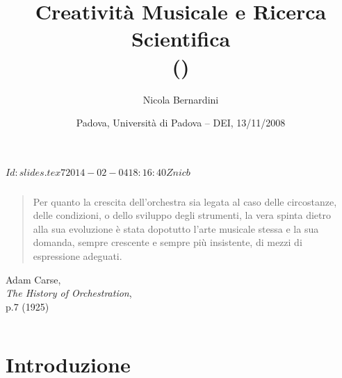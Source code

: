 \documentclass[compress]{beamer}
\title[Creativit\`a Musicale e Ricerca Scientifica]
{%
    Creativit\`a Musicale e Ricerca Scientifica\\
	{\tiny (\rcstag)}
}
\author{%
	Nicola Bernardini\\
    \href{mailto:\cpholderemail}{\cpholderemail}
}
\institute[SME-CCPPD]%
{%
	\href{http://www.conservatoriopollini.it}
		 {Conservatorio di Musica ``C.Pollini'' -- Padova}
}
\date[Padova, 13/11/2008]{Padova, Universit\`a di Padova -- DEI, 13/11/2008}
\begin{document}
\svnInfo $Id: slides.tex 7 2014-02-04 18:16:40Z nicb $
  
\begin{frame}
	\titlepage
\end{frame}

\begin{frame}
    
    \begin{columns}[T]
        \begin{column}{0.7\textwidth}
			    \begin{quote}
			        Per quanto la crescita dell'orchestra sia legata al caso delle
			        circostanze, delle condizioni, o dello sviluppo degli strumenti,
			        la vera spinta dietro alla sua evoluzione \`e stata dopotutto l'arte
			        musicale stessa e la sua domanda, sempre crescente e sempre pi\`u insistente,
			        di mezzi di espressione adeguati.%
			    \end{quote}
			    \begin{flushright}
			        Adam Carse,\\\emph{The History of Orchestration},\\p.7 (1925)
			    \end{flushright}
        \end{column}
        \begin{column}{0.3\textwidth}
            \begin{center}
            \end{center}
        \end{column}
    \end{columns}

\end{frame}
  
\section{Introduzione}
\end{document}
